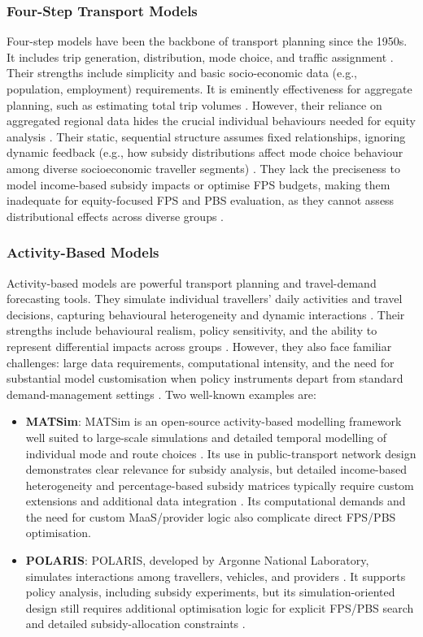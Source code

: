 \documentclass[a4paper,fleqn]{cas-sc}
\begin{document}
\subsubsection{Four-Step Transport Models}
Four-step models have been the backbone of transport planning since the 1950s. It includes trip generation, distribution, mode choice, and traffic assignment \citep{McNally2007a}. Their strengths include simplicity and basic socio-economic data (e.g., population, employment) requirements. It is eminently effectiveness for aggregate planning, such as estimating total trip volumes \citep{McNally2007a}. However, their reliance on aggregated regional data hides the crucial individual behaviours needed for equity analysis \citep{Martens2006}. Their static, sequential structure assumes fixed relationships, ignoring dynamic feedback (e.g., how subsidy distributions affect mode choice behaviour among diverse socioeconomic traveller segments) \citep{McNally2007a}. They lack the preciseness to model income-based subsidy impacts or optimise FPS budgets, making them inadequate for equity-focused FPS and PBS evaluation, as they cannot assess distributional effects across diverse groups \citep{Zhao2016}.

\subsubsection{Activity-Based Models}
Activity-based models are powerful transport planning and travel-demand forecasting tools. They simulate individual travellers' daily activities and travel decisions, capturing behavioural heterogeneity and dynamic interactions \citep{McNally2007b}. Their strengths include behavioural realism, policy sensitivity, and the ability to represent differential impacts across groups \citep{McNally2007b}. However, they also face familiar challenges: large data requirements, computational intensity, and the need for substantial model customisation when policy instruments depart from standard demand-management settings \citep{Freedman2025}. Two well-known examples are:

\begin{itemize}
    \item \textbf{MATSim}: MATSim is an open-source activity-based modelling framework well suited to large-scale simulations and detailed temporal modelling of individual mode and route choices \citep{Horni2016}. Its use in public-transport network design demonstrates clear relevance for subsidy analysis, but detailed income-based heterogeneity and percentage-based subsidy matrices typically require custom extensions and additional data integration \citep{Jafari2024}. Its computational demands and the need for custom MaaS/provider logic also complicate direct FPS/PBS optimisation.
    \item \textbf{POLARIS}: POLARIS, developed by Argonne National Laboratory, simulates interactions among travellers, vehicles, and providers \citep{Auld2016}. It supports policy analysis, including subsidy experiments, but its simulation-oriented design still requires additional optimisation logic for explicit FPS/PBS search and detailed subsidy-allocation constraints \citep{Wong2020}.
\end{itemize}
\end{document}
